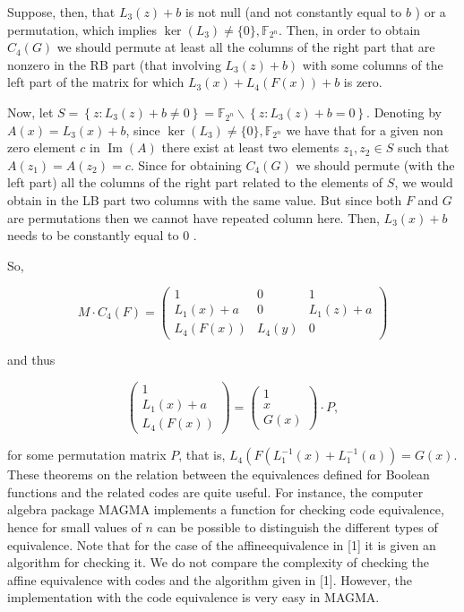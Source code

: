 \documentclass[10pt]{article}
\begin{document}
Suppose, then, that $L_{3}(z)+b$ is not null (and not constantly equal to $b$ ) or a permutation, which implies $\operatorname{ker}\left(L_{3}\right) \neq\{0\}, \mathbb{F}_{2^{n}}$. Then, in order to obtain $C_{4}(G)$ we should permute at least all the columns of the right part that are nonzero in the RB part (that involving $\left.L_{3}(z)+b\right)$ with some columns of the left part of the matrix for which $L_{3}(x)+L_{4}(F(x))+b$ is zero.

Now, let $S=\left\{z: L_{3}(z)+b \neq 0\right\}=\mathbb{F}_{2^{n}} \backslash\left\{z: L_{3}(z)+b=0\right\}$. Denoting by $A(x)=L_{3}(x)+b$, since $\operatorname{ker}\left(L_{3}\right) \neq\{0\}, \mathbb{F}_{2^{n}}$ we have that for a given non zero element $c$ in $\operatorname{Im}(A)$ there exist at least two elements $z_{1}, z_{2} \in S$ such that $A\left(z_{1}\right)=A\left(z_{2}\right)=c$. Since for obtaining $C_{4}(G)$ we should permute (with the left part) all the columns of the right part related to the elements of $S$, we would obtain in the LB part two columns with the same value. But since both $F$ and $G$ are permutations then we cannot have repeated column here. Then, $L_{3}(x)+b$ needs to be constantly equal to 0 .

So,

$$
M \cdot C_{4}(F)=\left(\begin{array}{ccc}
1 & 0 & 1 \\
L_{1}(x)+a & 0 & L_{1}(z)+a \\
L_{4}(F(x)) & L_{4}(y) & 0
\end{array}\right)
$$

and thus

$$
\left(\begin{array}{c}
1 \\
L_{1}(x)+a \\
L_{4}(F(x))
\end{array}\right)=\left(\begin{array}{c}
1 \\
x \\
G(x)
\end{array}\right) \cdot P,
$$

for some permutation matrix $P$, that is, $L_{4}\left(F\left(L_{1}^{-1}(x)+L_{1}^{-1}(a)\right)=G(x)\right.$.\\
These theorems on the relation between the equivalences defined for Boolean functions and the related codes are quite useful. For instance, the computer algebra package MAGMA implements a function for checking code equivalence, hence for small values of $n$ can be possible to distinguish the different types of equivalence. Note that for the case of the affineequivalence in [1] it is given an algorithm for checking it. We do not compare the complexity of checking the affine equivalence with codes and the algorithm given in [1]. However, the implementation with the code equivalence is very easy in MAGMA.
\end{document}
